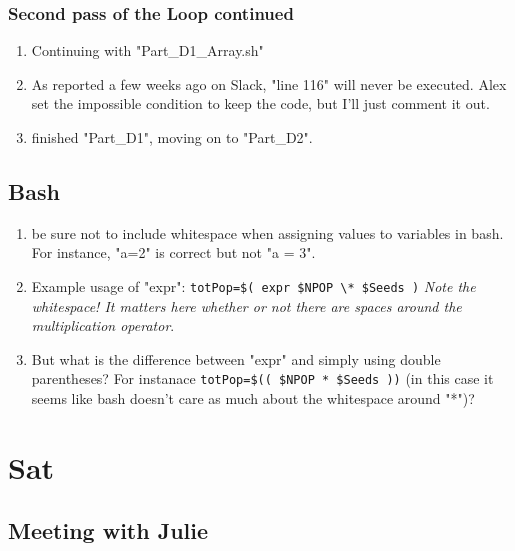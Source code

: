 \documentclass[12pt,letterpaper]{article}
\begin{document}
\subsubsection{Second pass of the Loop continued}
\begin{enumerate}
  \item Continuing with "Part_D1_Array.sh"
  \item As reported a few weeks ago on Slack, "line 116" will never be executed.
    Alex set the impossible condition to keep the code, but I'll just comment it out.
  \item finished "Part_D1", moving on to "Part_D2".
\end{enumerate}

\subsection{Bash}
\begin{enumerate}
  \item be sure not to include whitespace when assigning values to variables in bash.
    For instance, "a=2" is correct but not "a = 3".
  \item Example usage of "expr": \verb|totPop=$( expr $NPOP \* $Seeds )|
    \textit{Note the whitespace! It matters here whether or not there are spaces around
    the multiplication operator}.
  \item But what is the difference between "expr" and simply using double parentheses?
    For instanace \verb|totPop=$(( $NPOP * $Seeds ))|
    (in this case it seems like bash doesn't care as much about the whitespace around
    "*")?
\end{enumerate}

\section{Sat}
\subsection{Meeting with Julie}
\end{document}
